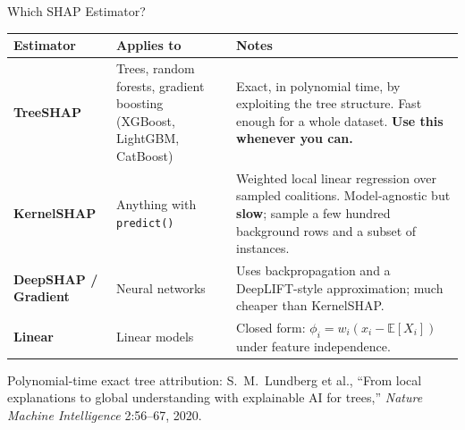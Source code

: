 \begin{frame}{Which SHAP Estimator?}

    \centering
    \scriptsize
    \begin{tabular}{p{2.5cm} p{4.2cm} p{5.2cm}}
        \toprule
        \textbf{Estimator} & \textbf{Applies to} & \textbf{Notes} \\
        \midrule
        \textbf{TreeSHAP} & Trees, random forests, gradient boosting (XGBoost, LightGBM, CatBoost)
        & Exact, in polynomial time, by exploiting the tree structure. Fast enough for a whole
          dataset. \textbf{Use this whenever you can.} \\
        \addlinespace
        \textbf{KernelSHAP} & Anything with \texttt{predict()}
        & Weighted local linear regression over sampled coalitions. Model-agnostic but
          \textbf{slow}; sample a few hundred background rows and a subset of instances. \\
        \addlinespace
        \textbf{DeepSHAP / Gradient} & Neural networks
        & Uses backpropagation and a DeepLIFT-style approximation; much cheaper than KernelSHAP. \\
        \addlinespace
        \textbf{Linear} & Linear models
        & Closed form: $\phi_i = w_i (x_i - \mathbb{E}[X_i])$ under feature independence. \\
        \bottomrule
    \end{tabular}

    \vspace{0.9em}
    \raggedright
    {\scriptsize Polynomial-time exact tree attribution: S.~M.~Lundberg et al., ``From local
    explanations to global understanding with explainable AI for trees,'' \emph{Nature Machine
    Intelligence} 2:56--67, 2020.}
\end{frame}

